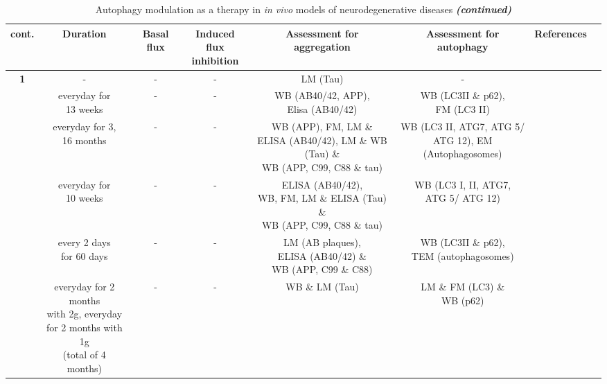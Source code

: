 \begin{landscape}
\begin{table}[p]
\scriptsize
\centering
\caption*{Autophagy modulation as a therapy in \textit{in vivo} models of neurodegenerative diseases \textbf{\textit{(continued)}}}
\begin{tabular}{cccccccc}
\toprule
\textbf{cont.} & Duration & Basal flux & \makecell{Induced flux \\inhibition} & \makecell{Assessment for \\aggregation} & \makecell{Assessment for \\autophagy} & References \\
\midrule
\multirow{8}{*}{\textbf{1}} & - & - & - & LM (Tau) & - & \citet{Berger2006} \\\cmidrule{5-6}
& \makecell{everyday for \\13 weeks} & - & - & \makecell{WB (AB40/42, APP),\\ Elisa (AB40/42)} & \makecell{WB (LC3II \& p62),\\ FM (LC3 II)} & \citet{Spilman2010} \\\cmidrule{5-6}
& \makecell{everyday for 3, \\16 months} & - & - & \makecell{WB (APP), FM, LM \& \\ELISA (AB40/42), LM \& WB (Tau) \& \\WB (APP, C99, C88 \& tau)} & \makecell{WB (LC3 II, ATG7, ATG 5/ \\ATG 12), EM (Autophagosomes)} & \citet{Majumder2011} \\\cmidrule{5-6}
& \makecell{everyday for \\10 weeks} & - & - & \makecell{ELISA (AB40/42), \\WB, FM, LM \& ELISA (Tau) \& \\ WB (APP, C99, C88 \& tau)} & \makecell{WB (LC3 I, II, ATG7, \\ATG 5/ ATG 12)} & \citet{Caccamo2010} \\\cmidrule{1-7}
\textbf{2} & \makecell{every 2 days \\for 60 days} & - & - & \makecell{LM (AB plaques), \\ELISA (AB40/42) \& \\WB (APP, C99 \& C88)} & \makecell{WB (LC3II \& p62), \\TEM (autophagosomes)} & \citet{Jiang2014a} \\\cmidrule{1-7}
\multirow{2}{*}{\textbf{3}} & \makecell{everyday for 2 months \\with 2g, everyday \\ for 2 months with 1g \\(total of 4 months)} & - & - & WB \& LM (Tau) & \makecell{LM \& FM (LC3) \& \\WB (p62)} & \citet{Shimada2012} \\

\end{tabular}
\end{table}
\end{landscape}
